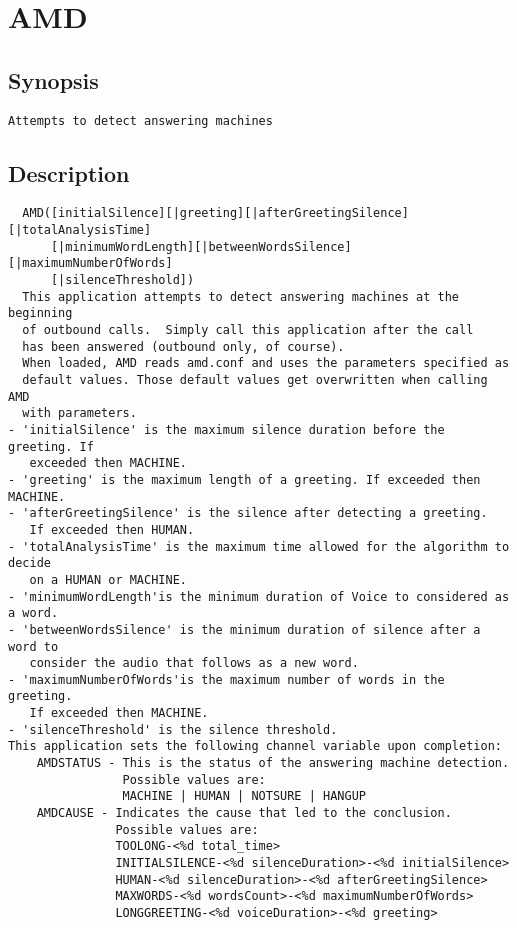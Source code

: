 \section{AMD}
\subsection{Synopsis}
\begin{verbatim}
Attempts to detect answering machines
\end{verbatim}
\subsection{Description}
\begin{verbatim}
  AMD([initialSilence][|greeting][|afterGreetingSilence][|totalAnalysisTime]
      [|minimumWordLength][|betweenWordsSilence][|maximumNumberOfWords]
      [|silenceThreshold])
  This application attempts to detect answering machines at the beginning
  of outbound calls.  Simply call this application after the call
  has been answered (outbound only, of course).
  When loaded, AMD reads amd.conf and uses the parameters specified as
  default values. Those default values get overwritten when calling AMD
  with parameters.
- 'initialSilence' is the maximum silence duration before the greeting. If
   exceeded then MACHINE.
- 'greeting' is the maximum length of a greeting. If exceeded then MACHINE.
- 'afterGreetingSilence' is the silence after detecting a greeting.
   If exceeded then HUMAN.
- 'totalAnalysisTime' is the maximum time allowed for the algorithm to decide
   on a HUMAN or MACHINE.
- 'minimumWordLength'is the minimum duration of Voice to considered as a word.
- 'betweenWordsSilence' is the minimum duration of silence after a word to 
   consider the audio that follows as a new word.
- 'maximumNumberOfWords'is the maximum number of words in the greeting. 
   If exceeded then MACHINE.
- 'silenceThreshold' is the silence threshold.
This application sets the following channel variable upon completion:
    AMDSTATUS - This is the status of the answering machine detection.
                Possible values are:
                MACHINE | HUMAN | NOTSURE | HANGUP
    AMDCAUSE - Indicates the cause that led to the conclusion.
               Possible values are:
               TOOLONG-<%d total_time>
               INITIALSILENCE-<%d silenceDuration>-<%d initialSilence>
               HUMAN-<%d silenceDuration>-<%d afterGreetingSilence>
               MAXWORDS-<%d wordsCount>-<%d maximumNumberOfWords>
               LONGGREETING-<%d voiceDuration>-<%d greeting>

\end{verbatim}


